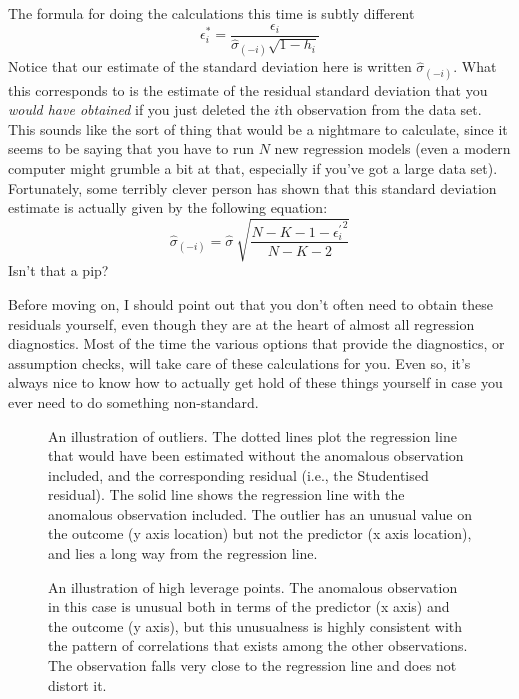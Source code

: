 \vspace{0.6cm}
\begin{mdframed}[style=MyFrame,nobreak=false]
The formula for doing the calculations this time is subtly different
$$
\epsilon_{i}^* = \frac{\epsilon_i}{\hat{\sigma}_{(-i)} \sqrt{1-h_i}}
$$
Notice that our estimate of the standard deviation here is written $\hat{\sigma}_{(-i)}$. What this corresponds to is the estimate of the residual standard deviation that you {\it would have obtained} if you just deleted the $i$th observation from the data set. This sounds like the sort of thing that would be a nightmare to calculate, since it seems to be saying that you have to run $N$ new regression models (even a modern computer might grumble a bit at that, especially if you've got a large data set). Fortunately, some terribly clever person has shown that this standard deviation estimate is actually given by the following equation:
$$
\hat\sigma_{(-i)} = \hat{\sigma} \ \sqrt{\frac{N-K-1 - {\epsilon_{i}^\prime}^2}{N-K-2}}
$$
Isn't that a pip? 
\end{mdframed}

Before moving on, I should point out that you don't often need to obtain these residuals yourself, even though they are at the heart of almost all regression diagnostics. Most of the time the various options that provide the diagnostics, or assumption checks, will take care of these calculations for you. Even so, it's always nice to know how to actually get hold of these things yourself in case you ever need to do something non-standard.



\begin{figure}[!htb]
\begin{center}
\caption{An illustration of outliers. The dotted lines plot the regression line that would have been estimated without the anomalous observation included, and the corresponding residual (i.e., the Studentised residual). The solid line shows the regression line with the anomalous observation included. The outlier has an unusual value on the outcome (y axis location) but not the predictor (x axis location), and lies a long way from the regression line.}
\HR
\label{fig:outlier}
\end{center}
\end{figure}

\begin{figure}[!htb]
\begin{center}
\caption{An illustration of high leverage points. The anomalous observation in this case is unusual both in terms of the predictor (x axis) and the outcome (y axis), but this unusualness is highly consistent with the pattern of correlations that exists among the other observations. The observation falls very close to the regression line and does not distort it.}
\HR
\label{fig:leverage}
\end{center}
\end{figure}

